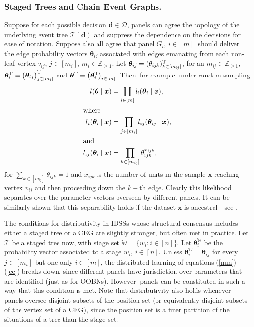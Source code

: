 \subsubsection{Staged Trees and Chain Event Graphs.}
\label{sec:IDSSET}
 Suppose for each possible decision $\bm{d}\in\bm{\mathcal{D}}$, panels can agree the topology of the underlying event tree  $\mathcal{T}(\bm{d})$ and suppress the dependence on the decisions for ease of notation. Suppose also all agree that panel $G_{i}$, $i\in[m]$, should deliver the edge probability vectors $\bm{\theta }_{ij}$ associated with edges emanating from each non-leaf vertex $v_{ij}$, $j\in[m_i]$, $m_i\in\mathbb{Z}_{\geq 1}$. Let $\bm{\theta }_{ij}= ( \theta _{ijk})_{k\in [m_{ij}]}^{\textnormal{T}}$, for an $m_{ij}\in\mathbb{Z}_{\geq 1}$, $\bm{\theta }_{i}^{\textnormal{T}}= \big( \bm{\theta }_{ij}\big)_{j\in[m_i]}^{\textnormal{T}}$ and $\bm{\theta }^{\textnormal{T}}= \big( \bm{\theta }^{\textnormal{T}}_{i}\big)_{i\in[m]} $. Then, for example, under random sampling
\begin{align}
\label{nun}
l(\bm{\theta }\;|\;\bm{x})&=\prod_{i\in[m]}l_{i}(\bm{\theta }_{i}\;|\;\bm{x}),\\
\shortintertext{where} 
l_{i}(\bm{\theta }_{i}\;|\;\bm{x})&=\prod_{j\in[m_i]}l_{ij}(\bm{\theta }_{ij}\;|\;\bm{x}),\\
\shortintertext{and} 
l_{ij}(\bm{\theta }_{i}\;|\;\bm{x})&=\prod_{k\in[m_{ij}]}\theta _{ijk}^{x_{ijk}},
\label{ce}
\end{align}%
for $\sum_{k\in[m_{ij}]}\theta _{ijk}=1$ and $x_{ijk}$ is the number of units in the sample $\bm{x}$ reaching vertex $v_{ij}$ and then proceeding down the $k-${th} edge. Clearly this likelihood separates over the parameter vectors overseen by different panels. It can be similarly shown that this separability holds if the dataset $\bm{x}$ is ancestral - see \citet{Smith2010}. 

The conditions for distributivity in IDSSs whose structural consensus includes either a staged tree or a CEG are slightly stronger, but often met in practice. Let $\mathcal{T}$ be a staged tree now, with stage set $\mathbb{W}=\{w_i:i\in[n]\}$. Let $\bm{\theta}_{i}^{\mathbb{W}}$ be the probability vector associated to a stage $w_i$, $i\in[n]$. Unless $\bm{\theta}_i^{\mathbb{W}}=\bm{\theta}_{ij}$ for every $j\in[m_i]$ but one only $i\in[m]$, the distributed learning of equations (\ref{nun})-(\ref{ce}) breaks down, since different panels have jurisdiction over parameters that are identified (just as for OOBNs).  However, panels can be constituted in such a way that this condition is met. Note that distributivity also holds whenever panels oversee disjoint subsets of the position set (or equivalently disjoint subsets of the vertex set of a CEG), since the position set is a finer partition of the situations of a tree than the stage set.

